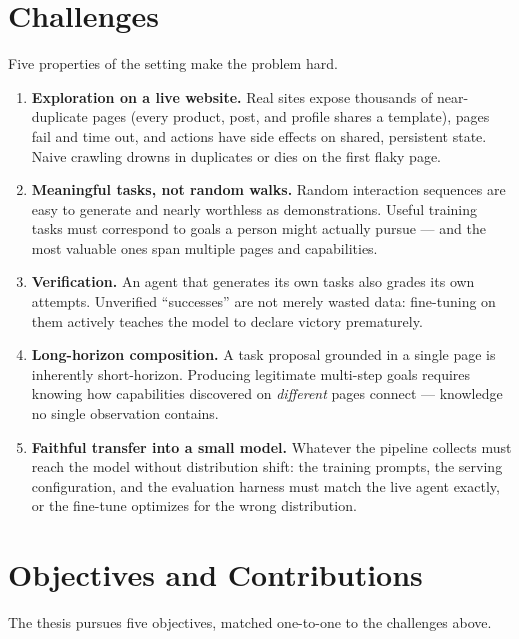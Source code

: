 \section{Challenges}
\label{sec:intro-challenges}

Five properties of the setting make the problem hard.

\begin{enumerate}
  \item \textbf{Exploration on a live website.} Real sites expose thousands
  of near-duplicate pages (every product, post, and profile shares a
  template), pages fail and time out, and actions have side effects on
  shared, persistent state. Naive crawling drowns in duplicates or dies on
  the first flaky page.
  \item \textbf{Meaningful tasks, not random walks.} Random interaction
  sequences are easy to generate and nearly worthless as demonstrations.
  Useful training tasks must correspond to goals a person might actually
  pursue --- and the most valuable ones span multiple pages and capabilities.
  \item \textbf{Verification.} An agent that generates its own tasks also
  grades its own attempts. Unverified ``successes'' are not merely wasted
  data: fine-tuning on them actively teaches the model to declare victory
  prematurely.
  \item \textbf{Long-horizon composition.} A task proposal grounded in a
  single page is inherently short-horizon. Producing legitimate multi-step
  goals requires knowing how capabilities discovered on \emph{different}
  pages connect --- knowledge no single observation contains.
  \item \textbf{Faithful transfer into a small model.} Whatever the pipeline
  collects must reach the model without distribution shift: the training
  prompts, the serving configuration, and the evaluation harness must match
  the live agent exactly, or the fine-tune optimizes for the wrong
  distribution.
\end{enumerate}

\section{Objectives and Contributions}
\label{sec:intro-contrib}

The thesis pursues five objectives, matched one-to-one to the challenges
above.

